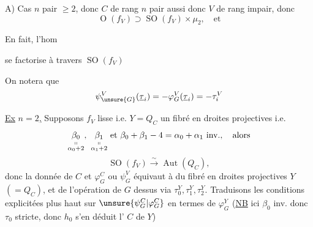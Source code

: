 
A) Cas $n$ pair $\geq 2$, donc $C$ de rang $n$ pair aussi donc $V$ de rang impair, donc
\[
\operatorname O(f_V)\supset\operatorname{SO}(f_V)\times\mu_2,\quad\text{et}
\]

En fait, l'hom

se factorise à travers $\operatorname{SO}(f_V)$

On notera que
\[
\psi_{\unsure{G}}^V(\underline{\tau}_i)=-\varphi_G^V(\underline{\tau}_i)=-\tau_i^V
\]

\uline{Ex} \uline{$n=2$,}  Supposons $f_V$ lisse i.e. $Y=Q_C$ un fibré en droites projectives i.e.
\[
\underset{\substack{\shortparallel\\\alpha_0+2}}{\beta_0},\
\underset{\substack{\shortparallel\\\alpha_1+2}}{\beta_1}
\ \text{et}\ \beta_0+\beta_1-4=\alpha_0+\alpha_1\ \text{inv.},\quad\text{alors}
\]
\[
\operatorname{SO}(f_V)\xrightarrow{\sim}\operatorname{Aut}(Q_C),
\]
donc la donnée de $C$ et $\varphi_G^C$ ou $\psi_G^V$ équivaut à  du fibré en droites projectives $Y$ $(=Q_C)$, et de l'opération de $G$ dessus via $\tau_0^Y,\tau_1^Y,\tau_2^Y$. Traduisons les conditions explicitées plus haut sur $\unsure{\psi_G^C|\varphi_G^C}$ en termes de $\varphi_G^Y$ (\uline{NB} ici $\beta_0$ inv. donc $\tau_0$  stricte, donc $h_0$ s'en déduit  l'  $C$ de $Y$)
